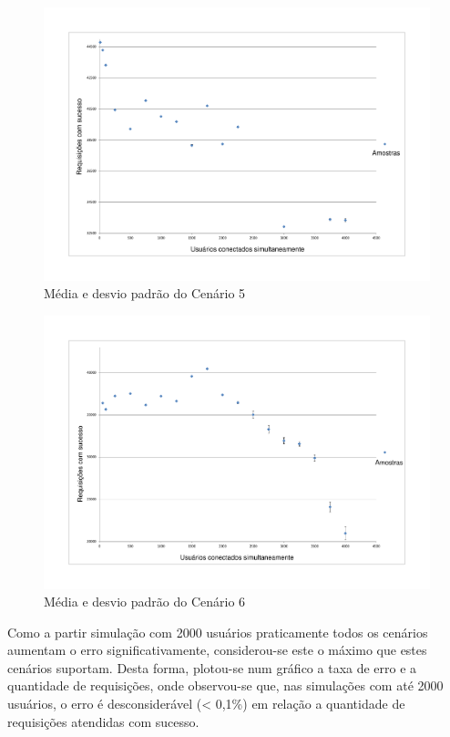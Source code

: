         \begin{figure}[H]
    \centering
    \includegraphics[scale=0.5]{imagens/dvp5.pdf}
    \caption{Média e desvio padrão do Cenário 5}
    \label{fig:dvp5}
    \end{figure}
    
    \begin{figure}[H]
    \centering
    \includegraphics[scale=0.5]{imagens/dvp6.pdf}
    \caption{Média e desvio padrão do Cenário 6}
    \label{fig:dvp6}
    \end{figure}
    
Como a partir simulação com 2000 usuários praticamente todos os cenários aumentam o erro significativamente, considerou-se este o máximo que estes cenários suportam. Desta forma, plotou-se num gráfico a taxa de erro e a quantidade de requisições, onde observou-se que, nas simulações com até 2000 usuários, o erro é desconsiderável (< 0,1\%) em relação a quantidade de requisições atendidas com sucesso.

